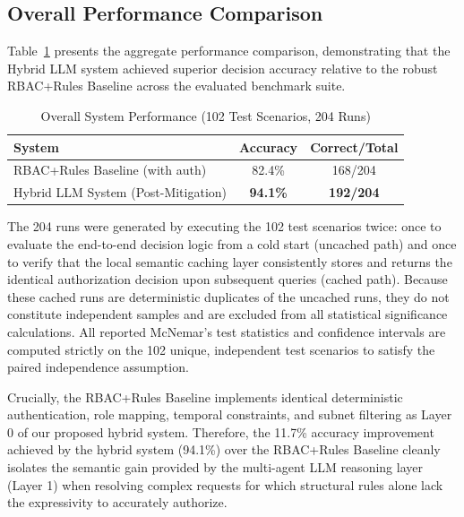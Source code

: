 \documentclass[
]{ceurart}
\begin{document}
\subsection{Overall Performance Comparison}

Table~\ref{tab:overall} presents the aggregate performance comparison, demonstrating that the Hybrid LLM system achieved superior decision accuracy relative to the robust RBAC+Rules Baseline across the evaluated benchmark suite.

\begin{table}[htbp]
    \centering
    \caption{Overall System Performance (102 Test Scenarios, 204 Runs)}
    \label{tab:overall}
    \begin{tabular}{lcc}
        \toprule
        \textbf{System}                   & \textbf{Accuracy}                                        & \textbf{Correct/Total} \\
        \midrule
        RBAC+Rules Baseline (with auth)   & 82.4\%                                                   & 168/204                 \\
        Hybrid LLM System (Post-Mitigation) & \textbf{94.1\%}                                          & \textbf{192/204}                 \\
        \bottomrule
    \end{tabular}
\end{table}

The 204 runs were generated by executing the 102 test scenarios twice: once to evaluate the end-to-end decision logic from a cold start (uncached path) and once to verify that the local semantic caching layer consistently stores and returns the identical authorization decision upon subsequent queries (cached path). Because these cached runs are deterministic duplicates of the uncached runs, they do not constitute independent samples and are excluded from all statistical significance calculations. All reported McNemar's test statistics and confidence intervals are computed strictly on the 102 unique, independent test scenarios to satisfy the paired independence assumption.

Crucially, the RBAC+Rules Baseline implements identical deterministic authentication, role mapping, temporal constraints, and subnet filtering as Layer 0 of our proposed hybrid system. Therefore, the 11.7\% accuracy improvement achieved by the hybrid system (94.1\%) over the RBAC+Rules Baseline cleanly isolates the semantic gain provided by the multi-agent LLM reasoning layer (Layer 1) when resolving complex requests for which structural rules alone lack the expressivity to accurately authorize.
\end{document}
